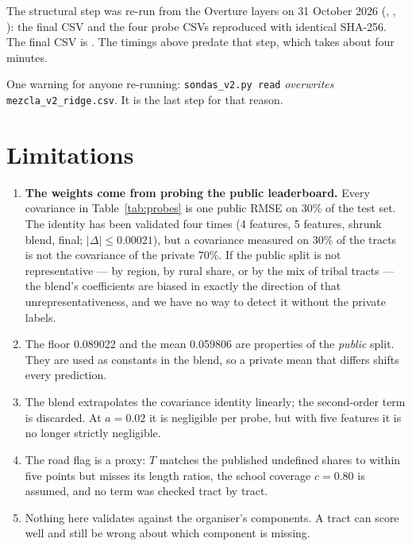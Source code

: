 \documentclass[a4paper]{article}
\begin{document}
The structural step was re-run from the Overture layers on 31 October 2026
(, , ): the final CSV and the four
probe CSVs reproduced with identical SHA-256. The final CSV is
. The timings above predate that step, which takes about
four minutes.

One warning for anyone re-running: \texttt{sondas\_v2.py read} \emph{overwrites}
\texttt{mezcla\_v2\_ridge.csv}. It is the last step for that reason.

\section{Limitations}

\begin{enumerate}
\item \textbf{The weights come from probing the public leaderboard.} Every covariance in
Table~\ref{tab:probes} is one public RMSE on 30\% of the test set. The identity has been
validated four times (4 features, 5 features, shrunk blend, final; $|\Delta|\le\num{0.00021}$), but a covariance measured on
30\% of the tracts is not the covariance of the private 70\%. If the public split is not
representative --- by region, by rural share, or by the mix of tribal tracts --- the blend's
coefficients are biased in exactly the direction of that unrepresentativeness, and we have no
way to detect it without the private labels.
\item The floor \num{0.089022} and the mean \num{0.059806} are properties of the \emph{public}
split. They are used as constants in the blend, so a private mean that differs shifts every
prediction.
\item The blend extrapolates the covariance identity linearly; the second-order term is
discarded. At $a=0.02$ it is negligible per probe, but with five features it is no longer
strictly negligible.
\item The road flag is a proxy: $\hat{T}$ matches the published undefined shares to within five points but
misses its length ratios, the school coverage $c=0.80$ is assumed, and no term was checked tract by tract.
\item Nothing here validates against the organiser's components. A tract can score well and
still be wrong about which component is missing.
\end{enumerate}
\end{document}
